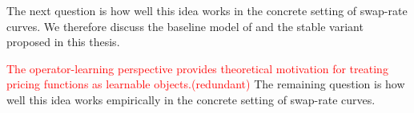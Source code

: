 

The next question is how well this idea works in the concrete setting of swap-rate curves. We therefore discuss the baseline model of \citet{MatinWanPoulsen2025} and the stable variant proposed in this thesis.

\textcolor{red}{The operator-learning perspective provides theoretical motivation for treating pricing functions as learnable objects.(redundant)} The remaining question is how well this idea works empirically in the concrete setting of swap-rate curves. 






